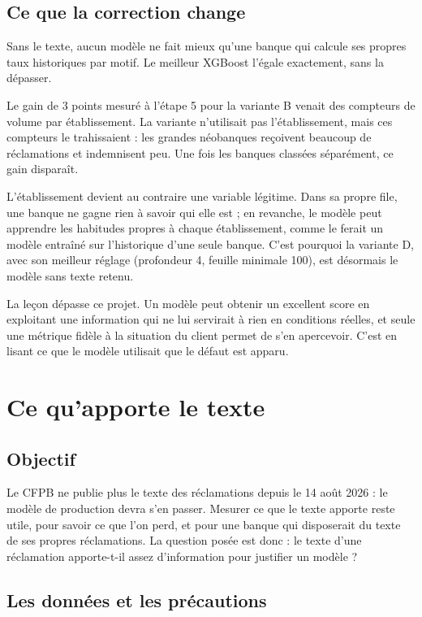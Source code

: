 \documentclass[11pt,a4paper]{article}
\begin{document}
\subsection{Ce que la correction change}

Sans le texte, aucun modèle ne fait mieux qu'une banque qui calcule ses propres taux historiques par motif. Le meilleur XGBoost l'égale exactement, sans la dépasser.

Le gain de 3 points mesuré à l'étape 5 pour la variante B venait des compteurs de volume par établissement. La variante n'utilisait pas l'établissement, mais ces compteurs le trahissaient : les grandes néobanques reçoivent beaucoup de réclamations et indemnisent peu. Une fois les banques classées séparément, ce gain disparaît.

L'établissement devient au contraire une variable légitime. Dans sa propre file, une banque ne gagne rien à savoir qui elle est ; en revanche, le modèle peut apprendre les habitudes propres à chaque établissement, comme le ferait un modèle entraîné sur l'historique d'une seule banque. C'est pourquoi la variante D, avec son meilleur réglage (profondeur 4, feuille minimale 100), est désormais le modèle sans texte retenu.

La leçon dépasse ce projet. Un modèle peut obtenir un excellent score en exploitant une information qui ne lui servirait à rien en conditions réelles, et seule une métrique fidèle à la situation du client permet de s'en apercevoir. C'est en lisant ce que le modèle utilisait que le défaut est apparu.

\section{Ce qu'apporte le texte}

\subsection{Objectif}

Le CFPB ne publie plus le texte des réclamations depuis le 14 août 2026 : le modèle de production devra s'en passer. Mesurer ce que le texte apporte reste utile, pour savoir ce que l'on perd, et pour une banque qui disposerait du texte de ses propres réclamations. La question posée est donc : le texte d'une réclamation apporte-t-il assez d'information pour justifier un modèle ?

\subsection{Les données et les précautions}
\end{document}
